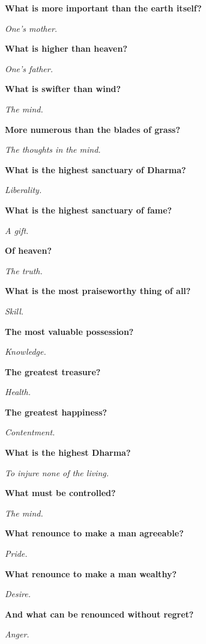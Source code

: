 \vspace*{1.2cm} \textbf{What is more important than the earth itself?} 

\textit{One's mother.}\medskip 

\textbf{What is higher than heaven?} 

\textit{One's father.}\medskip 

\textbf{What is swifter than wind?} 

\textit{The mind.}\medskip 

\textbf{More numerous than the blades of grass?} 

\textit{The thoughts in the mind.}\medskip 

\textbf{What is the highest sanctuary of Dharma?} 

\textit{Liberality.}\medskip 

\textbf{What is the highest sanctuary of fame?} 

\textit{A gift.}\medskip 

\textbf{Of heaven?} 

\textit{The truth.}\medskip 

\textbf{What is the most praiseworthy thing of all?} 

\textit{Skill.}\medskip 

\textbf{The most valuable possession?} 

\textit{Knowledge.}\medskip 

\textbf{The greatest treasure?} 

\textit{Health.}\medskip 

\textbf{The greatest happiness?} 

\textit{Contentment.}\medskip 

\textbf{What is the highest Dharma?} 

\textit{To injure none of the living.}\medskip 

\textbf{What must be controlled?} 

\textit{The mind.}\medskip 

\textbf{What renounce to make a man agreeable?} 

\textit{Pride.}\medskip\vfill\pagebreak\vspace*{1.2cm} 

\textbf{What renounce to make a man wealthy?} 

\textit{Desire.}\medskip 

\textbf{And what can be renounced without regret?} 

\textit{Anger.}\medskip 

